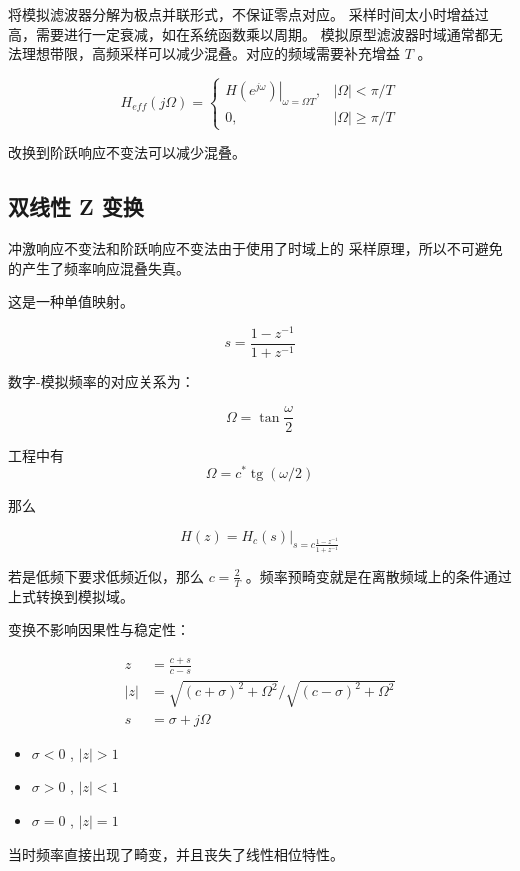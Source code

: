 \documentclass[cn,11pt,chinese,black,simple]{elegantbook}
\begin{document}
将模拟滤波器分解为极点并联形式，不保证零点对应。
采样时间太小时增益过高，需要进行一定衰减，如在系统函数乘以周期。
模拟原型滤波器时域通常都无法理想带限，高频采样可以减少混叠。对应的频域需要补充增益 \(T\) 。


\[
H_{e f f}(j \Omega)=\left\{\begin{array}{cc}
\left.H\left(e^{j \omega}\right)\right|_{\omega=\Omega T}, & |\Omega|<\pi / T \\
0, & |\Omega| \geq \pi / T
\end{array}\right.
\]

改换到阶跃响应不变法可以减少混叠。


\subsection{双线性 Z 变换}

冲激响应不变法和阶跃响应不变法由于使用了时域上的
采样原理，所以不可避免的产生了频率响应混叠失真。

这是一种单值映射。

\[
s=\frac{1-z^{-1}}{1+z^{-1}}
\]

数字-模拟频率的对应关系为：

\[\Omega = \tan \frac{\omega}{2}\]

工程中有 \[
    \Omega=c^{*} \operatorname{tg}(\omega / 2)
    \]

那么

\[
H(z)=\left.H_{c}(s)\right|_{s=c \frac{1-z^{-1}}{1+z^{-1}}} 
\]

若是低频下要求低频近似，那么 \({c = \frac{2}{T}}\) 。频率预畸变就是在离散频域上的条件通过上式转换到模拟域。

变换不影响因果性与稳定性：

\[
\begin{aligned}
z & =\frac{c+s}{c-s} \\
|z| &=\sqrt{(c+\sigma)^{2}+\Omega^{2}} / \sqrt{(c-\sigma)^{2}+\Omega^{2}} \\ 
s &= \sigma + j \Omega
\end{aligned}
\]

\begin{itemize}
    \item \(\sigma < 0\) ,  \(|z| > 1\) 
    \item \(\sigma > 0\) ,  \(|z| < 1\) 
    \item \(\sigma = 0\) ,  \(|z| = 1\) 
\end{itemize}


当时频率直接出现了畸变，并且丧失了线性相位特性。
\end{document}
